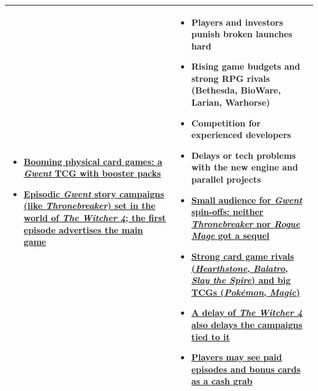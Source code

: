 \documentclass[11pt,a4paper]{article}
\begin{document}
\begin{tabularx}{\textwidth}{|>{\raggedright\arraybackslash}X|>{\raggedright\arraybackslash}X|}
\begin{itemize}
  \item \uline{Booming physical card games: a \textit{Gwent} TCG with booster packs}
  \item \uline{Episodic \textit{Gwent} story campaigns (like \textit{Thronebreaker}) set in the world of \textit{The Witcher 4}; the first episode advertises the main game}
\end{itemize}
&
\begin{itemize}
  \item Players and investors punish broken launches hard
  \item Rising game budgets and strong RPG rivals (Bethesda, BioWare, Larian, Warhorse)
  \item Competition for experienced developers
  \item Delays or tech problems with the new engine and parallel projects
  \item \uline{Small audience for \textit{Gwent} spin-offs: neither \textit{Thronebreaker} nor \textit{Rogue Mage} got a sequel}
  \item \uline{Strong card game rivals (\textit{Hearthstone}, \textit{Balatro}, \textit{Slay the Spire}) and big TCGs (\textit{Pokémon}, \textit{Magic})}
  \item \uline{A delay of \textit{The Witcher 4} also delays the campaigns tied to it}
  \item \uline{Players may see paid episodes and bonus cards as a cash grab}
\end{itemize}
\\
\hline
\end{tabularx}
\end{document}
